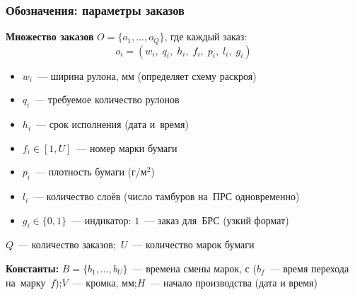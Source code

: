 \begin{frame}
    \frametitle{Обозначения: параметры заказов}
    \textbf{Множество заказов} $O = \{o_1,\ldots,o_Q\}$, где каждый заказ:
    \[
    o_i = (w_i,\;q_i,\;h_i,\;f_i,\;p_i,\;l_i,\;g_i)
    \]
    \begin{itemize}
        \item $w_i$~--- ширина рулона, мм (определяет схему раскроя)
        \item $q_i$~--- требуемое количество рулонов
        \item $h_i$~--- срок исполнения (дата и~время)
        \item $f_i\in[1,U]$~--- номер марки бумаги
        \item $p_i$~--- плотность бумаги (г/м$^2$)
        \item $l_i$~--- количество слоёв (число тамбуров на~ПРС одновременно)
        \item $g_i\in\{0,1\}$~--- индикатор: $1$~--- заказ для~БРС (узкий формат)
    \end{itemize}
    \vspace{0.1cm}
    $Q$~--- количество заказов;\ $U$~--- количество марок бумаги

    \textbf{Константы:} $B=\{b_1,\ldots,b_U\}$~--- времена смены марок, с ($b_f$~--- время перехода на~марку~$f$);\quad $V$~--- кромка, мм;\quad $H$~--- начало производства (дата и время)
\end{frame}

